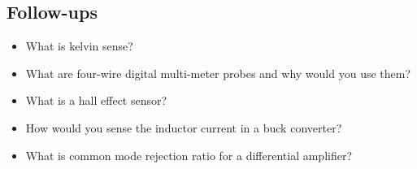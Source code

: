 \documentclass[main.tex]{subfiles}
\begin{document}
\subsection{Follow-ups}
\begin{itemize}
    \item What is kelvin sense? 
    \item What are four-wire digital multi-meter probes and why would you use them?
    \item What is a hall effect sensor?
    \item How would you sense the inductor current in a buck converter?
    \item What is common mode rejection ratio for a differential amplifier?
\end{itemize}
\end{document}
